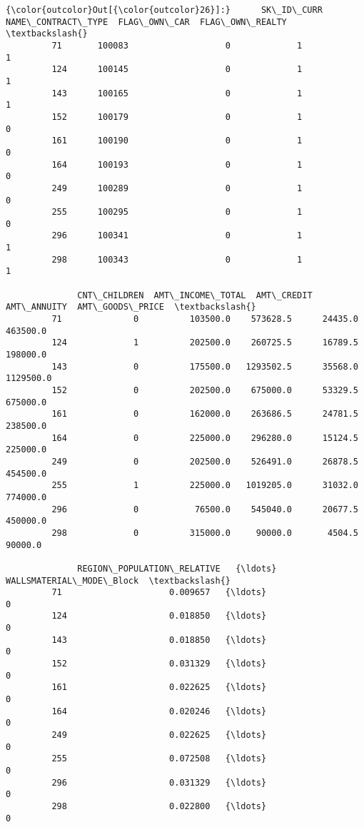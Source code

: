 \documentclass[11pt]{article}
\begin{document}
\begin{Verbatim}[commandchars=\\\{\}]
{\color{outcolor}Out[{\color{outcolor}26}]:}      SK\_ID\_CURR  NAME\_CONTRACT\_TYPE  FLAG\_OWN\_CAR  FLAG\_OWN\_REALTY  \textbackslash{}
         71       100083                   0             1                1   
         124      100145                   0             1                1   
         143      100165                   0             1                1   
         152      100179                   0             1                0   
         161      100190                   0             1                0   
         164      100193                   0             1                0   
         249      100289                   0             1                0   
         255      100295                   0             1                0   
         296      100341                   0             1                1   
         298      100343                   0             1                1   
         
              CNT\_CHILDREN  AMT\_INCOME\_TOTAL  AMT\_CREDIT  AMT\_ANNUITY  AMT\_GOODS\_PRICE  \textbackslash{}
         71              0          103500.0    573628.5      24435.0         463500.0   
         124             1          202500.0    260725.5      16789.5         198000.0   
         143             0          175500.0   1293502.5      35568.0        1129500.0   
         152             0          202500.0    675000.0      53329.5         675000.0   
         161             0          162000.0    263686.5      24781.5         238500.0   
         164             0          225000.0    296280.0      15124.5         225000.0   
         249             0          202500.0    526491.0      26878.5         454500.0   
         255             1          225000.0   1019205.0      31032.0         774000.0   
         296             0           76500.0    545040.0      20677.5         450000.0   
         298             0          315000.0     90000.0       4504.5          90000.0   
         
              REGION\_POPULATION\_RELATIVE   {\ldots}    WALLSMATERIAL\_MODE\_Block  \textbackslash{}
         71                     0.009657   {\ldots}                           0   
         124                    0.018850   {\ldots}                           0   
         143                    0.018850   {\ldots}                           0   
         152                    0.031329   {\ldots}                           0   
         161                    0.022625   {\ldots}                           0   
         164                    0.020246   {\ldots}                           0   
         249                    0.022625   {\ldots}                           0   
         255                    0.072508   {\ldots}                           0   
         296                    0.031329   {\ldots}                           0   
         298                    0.022800   {\ldots}                           0   
         

\end{Verbatim}
\end{document}
